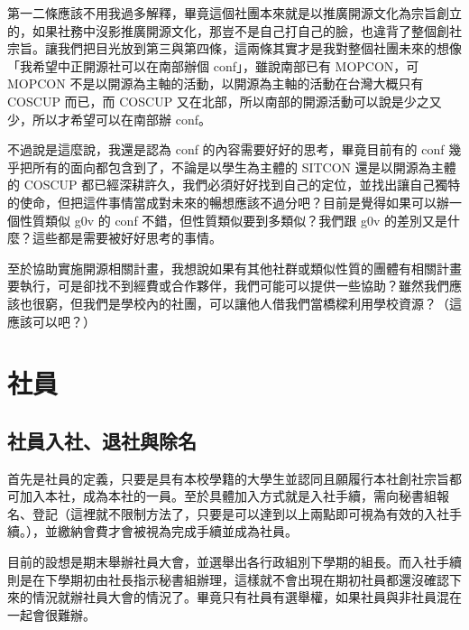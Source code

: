 \documentclass[12pt, a4paper]{NGPLB}
\begin{document}
第一二條應該不用我過多解釋，畢竟這個社團本來就是以推廣開源文化為宗旨創立的，如果社務中沒影推廣開源文化，那豈不是自己打自己的臉，也違背了整個創社宗旨。讓我們把目光放到第三與第四條，這兩條其實才是我對整個社團未來的想像「我希望中正開源社可以在南部辦個 conf」，雖說南部已有 MOPCON，可 MOPCON 不是以開源為主軸的活動，以開源為主軸的活動在台灣大概只有 COSCUP 而已，而 COSCUP 又在北部，所以南部的開源活動可以說是少之又少，所以才希望可以在南部辦 conf。

不過說是這麼說，我還是認為 conf 的內容需要好好的思考，畢竟目前有的 conf 幾乎把所有的面向都包含到了，不論是以學生為主體的 SITCON 還是以開源為主體的 COSCUP 都已經深耕許久，我們必須好好找到自己的定位，並找出讓自己獨特的使命，但把這件事情當成對未來的暢想應該不過分吧？目前是覺得如果可以辦一個性質類似 g0v 的 conf 不錯，但性質類似要到多類似？我們跟 g0v 的差別又是什麼？這些都是需要被好好思考的事情。

至於協助實施開源相關計畫，我想說如果有其他社群或類似性質的團體有相關計畫要執行，可是卻找不到經費或合作夥伴，我們可能可以提供一些協助？雖然我們應該也很窮，但我們是學校內的社團，可以讓他人借我們當橋樑利用學校資源？（這應該可以吧？）

\chapter{社員}

\section{社員入社、退社與除名}

首先是社員的定義，只要是具有本校學籍的大學生並認同且願履行本社創社宗旨都可加入本社，成為本社的一員。至於具體加入方式就是入社手續，需向秘書組報名、登記（這裡就不限制方法了，只要是可以達到以上兩點即可視為有效的入社手續。），並繳納會費才會被視為完成手續並成為社員。




目前的設想是期末舉辦社員大會，並選舉出各行政組別下學期的組長。而入社手續則是在下學期初由社長指示秘書組辦理，這樣就不會出現在期初社員都還沒確認下來的情況就辦社員大會的情況了。畢竟只有社員有選舉權，如果社員與非社員混在一起會很難辦。
\end{document}
